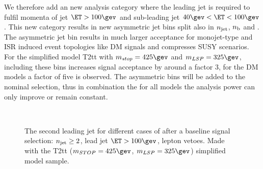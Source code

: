 We therefore add an new analysis category where the leading jet is required to fulfil 
momenta of jet $\ET>100\gev$ and sub-leading jet $40\gev<\ET<100\gev$. This new category 
results in new asymmetric jet bins split also in $n_{\text{jet}}$, $n_{\text{b}}$ and \HT. The asymmetric jet bin
results in much larger acceptance for monojet-type and ISR induced event topologies like DM signals
and compresses SUSY scenarios. 
For the simplified model T2tt with $m_{stop}=425\gev$ and $m_{LSP}=325\gev$, 
including these bins increases signal acceptance by around a factor 3, for the DM models a factor of five is observed.
The asymmetric bins will be added to the nominal selection, thus in combination the for all models the analysis power can only improve or remain constant.
\begin{figure}[h!]
  \centering
  ~~
  \\
  \caption{\label{fig:asymMotivation} The second leading jet \PT for different
  cases of \HT after a baseline signal selection: $n_{\text{jet}}\geq2$, lead jet
  $\ET>100\gev$, lepton vetoes. Made with the T2tt ($m_{STOP}=425\gev$, $m_{LSP}=325\gev$) simplified model sample.}
\end{figure}


